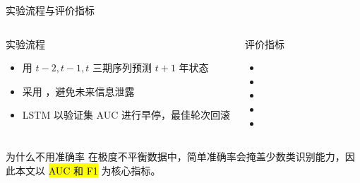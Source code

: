 \begin{frame}{实验流程与评价指标}
  \begin{columns}[T,onlytextwidth]
    \begin{block}{实验流程}
      \begin{itemize}
        \item 用 $t-2,t-1,t$ 三期序列预测 $t+1$ 年状态
        \item 采用 ，避免未来信息泄露
        \item LSTM 以验证集 AUC 进行早停，最佳轮次回滚
      \end{itemize}
    \end{block}

    \begin{exampleblock}{评价指标}
      \begin{itemize}
        \item {}
        \item {}
        \item {}
        \item {}
        \item {}
      \end{itemize}
    \end{exampleblock}
  \end{columns}

  \begin{alertblock}{为什么不用准确率}
    在极度不平衡数据中，简单准确率会掩盖少数类识别能力，因此本文以 \hl{AUC 和 F1} 为核心指标。
  \end{alertblock}
\end{frame}
